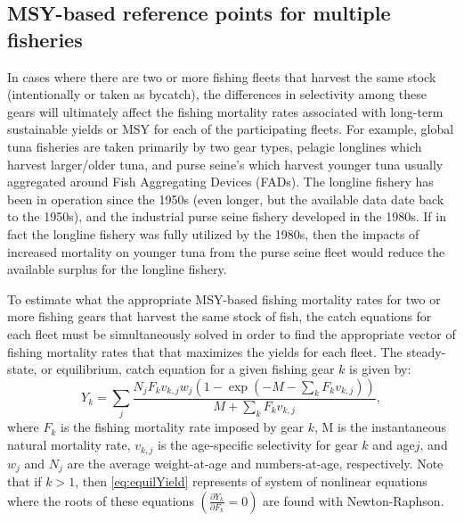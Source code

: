
\subsection{MSY-based reference points for multiple fisheries} %
\label{sub:msy_based_reference_points_for_multiple_fisheries}

In cases where there are two or more fishing fleets that harvest the same stock (intentionally or taken as bycatch), the differences in selectivity among these gears will ultimately affect the fishing mortality rates associated with long-term sustainable yields or MSY for each of the participating fleets.  For example, global tuna fisheries are taken primarily by two gear types, pelagic longlines which harvest larger/older tuna, and purse seine's which harvest younger tuna usually aggregated around Fish Aggregating Devices (FADs).  The longline fishery has been in operation since the 1950s (even longer, but the available data date back to the 1950s), and the industrial purse seine fishery developed in the 1980s.  If in fact the longline fishery was fully utilized by the 1980s, then the impacts of increased mortality on younger tuna from the purse seine fleet would reduce the available surplus for the longline fishery.

To estimate what the appropriate MSY-based fishing mortality rates for two or more fishing gears that harvest the same stock of fish, the catch equations for each fleet must be simultaneously solved in order to find the appropriate vector of fishing mortality rates that that maximizes the yields for each fleet.  The steady-state, or equilibrium, catch equation for a given fishing gear $k$ is given by:
\begin{equation}\label{eq:equilYield}
	 Y_{k} = \sum_j\frac{N_j F_k v_{k,j} w_j (1-\exp(-M-\sum_k F_k v_{k,j}))} {M + \sum_k F_k v_{k,j}},
\end{equation}
where $F_k$ is the fishing mortality rate imposed by gear $k$, M is the instantaneous natural mortality rate, $v_{k,j}$ is the age-specific selectivity for gear $k$ and age$j$, and $w_j$ and $N_j$ are the average weight-at-age and numbers-at-age, respectively.  Note that if $k>1$, then \eqref{eq:equilYield} represents of system of nonlinear equations where the roots of these equations $\left(\frac{\partial Y_k}{\partial F_k}=0\right)$ are found with Newton-Raphson.


